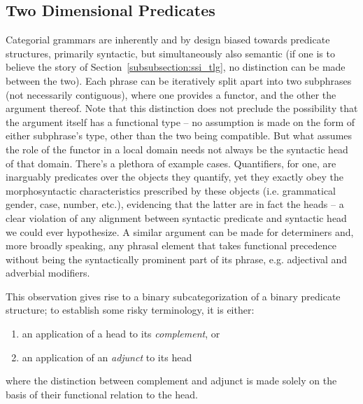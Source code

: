 \subsection{Two Dimensional Predicates}
Categorial grammars are inherently and by design biased towards predicate structures, primarily syntactic, but simultaneously also semantic (if one is to believe the story of Section~\ref{subsubsection:ssi_tlg}, no distinction can be made between the two).
Each phrase can be iteratively split apart into two subphrases (not necessarily contiguous), where one provides a functor, and the other the argument thereof.
Note that this distinction does not preclude the possibility that the argument itself has a functional type -- no assumption is made on the form of either subphrase's type, other than the two being compatible.
But what assumes the role of the functor in a local domain needs not always be the syntactic head of that domain.
There's a plethora of example cases.
Quantifiers, for one, are inarguably predicates over the objects they quantify, yet they exactly obey the morphosyntactic characteristics prescribed by these objects (i.e. grammatical gender, case, number, etc.), evidencing that the latter are in fact the heads -- a clear violation of any alignment between syntactic predicate and syntactic head we could ever hypothesize. 
A similar argument can be made for determiners and, more broadly speaking, any phrasal element that takes functional precedence without being the syntactically prominent part of its phrase, e.g. adjectival and adverbial modifiers.

This observation gives rise to a binary subcategorization of a binary predicate structure; to establish some risky terminology, it is either:
\begin{enumerate}
	\item an application of a head to its \textit{complement}, or
	\item an application of an \textit{adjunct} to its head
\end{enumerate}
where the distinction between complement and adjunct is made solely on the basis of their functional relation to the head.

